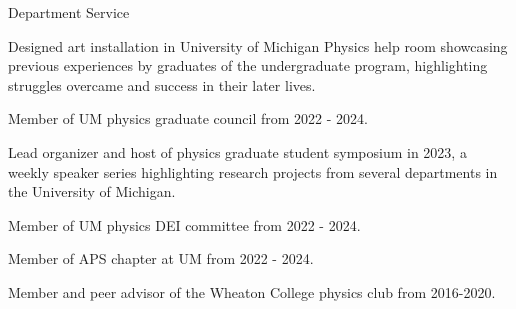 \documentclass{resume} %
\newcommand{\tab}[1]{\hspace{.2667\textwidth}\rlap{#1}}
\newcommand{\itab}[1]{\hspace{0em}\rlap{#1}}
\begin{document}

\newpage
\begin{rSection}{Department Service}
    \begin{itemize}
        \item Designed art installation in University of Michigan Physics help room showcasing previous experiences by graduates of the undergraduate program, highlighting struggles overcame and success in their later lives.
        \item{Member of UM physics graduate council from 2022 - 2024. 
        \item Lead organizer and host of physics graduate student symposium in 2023, a weekly speaker series highlighting research projects from several departments in the University of Michigan.}
    	\item{Member of UM physics DEI committee from 2022 - 2024.}
	\item Member of APS chapter at UM from 2022 - 2024.
        \item Member and peer advisor of the Wheaton College physics club from 2016-2020.
    \end{itemize}
\end{rSection}
    
                
\end{document}
